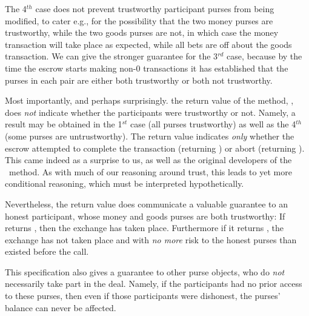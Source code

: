 The
 4$^{th}$ case does not prevent trustworthy participant purses from
 being modified, to cater e.g., for the possibility that the two money
 purses are  trustworthy, while the two goods purses are not, in which
 case  the money transaction will take place as expected,  while all
 bets are off about the goods transaction.
 We can give the stronger guarantee for the 3$^{rd}$ case, because by
 the time the escrow starts making non-$0$ transactions  it has established that the purses in each
 pair are either both trustworthy or both not trustworthy.

Most importantly, and perhaps surprisingly.
the return value of the method, , does {\em not} indicate
whether the participants were trustworthy or not. Namely, a 
result may be obtained in the 1$^{st}$ case (all purses trustworthy)
as well as the 4$^{th}$ (some purses are untrustworthy).  The
return value indicates {\em only} whether the escrow attempted to complete the
transaction (returning ) or abort (returning
). This came indeed
  as a surprise to us, as well as the original developers of the \ method.
As with much of our reasoning around trust,
this leads to yet more conditional reasoning, which must be
interpreted hypothetically.

Nevertheless, the return value does communicate a valuable guarantee to an honest
participant,   whose money and goods purses are both
trustworthy:  If  returns , then the exchange has taken
place. Furthermore if it returns , the exchange has not taken
place and with \textit{no more} risk to the honest purses than existed before the call.





This  specification also gives a guarantee to other
purse objects, who do {\em not} necessarily take part in the
deal. Namely, if the participants had no prior access to these purses,
then even if those participants were dishonest, the purses' balance
can never be affected.

 
